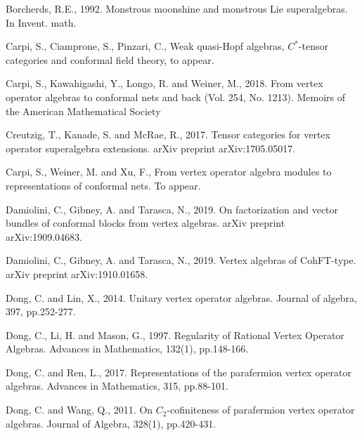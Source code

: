 \documentclass[12pt,a4paper]{article}
\theoremstyle{definition}
\theoremstyle{plain}
\numberwithin{equation}{subsection}
\begin{document}
\begin{thebibliography}{999999}
Borcherds, R.E., 1992. Monstrous moonshine and monstrous Lie superalgebras. In Invent. math.

Carpi, S., Ciamprone, S., Pinzari, C., Weak quasi-Hopf algebras, $C^*$-tensor categories and conformal field theory, to appear.

Carpi, S., Kawahigashi, Y., Longo, R. and Weiner, M., 2018. From vertex operator algebras to conformal nets and back (Vol. 254, No. 1213). Memoirs of the American Mathematical Society

Creutzig, T., Kanade, S. and McRae, R., 2017. Tensor categories for vertex operator superalgebra extensions. arXiv preprint arXiv:1705.05017.

Carpi, S., Weiner, M. and Xu, F., From vertex operator algebra modules to representations of conformal nets. To appear.

Damiolini, C., Gibney, A. and Tarasca, N., 2019. On factorization and vector bundles of conformal blocks from vertex algebras. arXiv preprint arXiv:1909.04683.

Damiolini, C., Gibney, A. and Tarasca, N., 2019. Vertex algebras of CohFT-type. arXiv preprint arXiv:1910.01658.

Dong, C. and Lin, X., 2014. Unitary vertex operator algebras. Journal of algebra, 397, pp.252-277.

Dong, C., Li, H. and Mason, G., 1997. Regularity of Rational Vertex Operator Algebras. Advances in Mathematics, 132(1), pp.148-166.



Dong, C. and Ren, L., 2017. Representations of the parafermion vertex operator algebras. Advances in Mathematics, 315, pp.88-101.

Dong, C. and Wang, Q., 2011. On $C_2$-cofiniteness of parafermion vertex operator algebras. Journal of Algebra, 328(1), pp.420-431.


\end{thebibliography}
\end{document}
